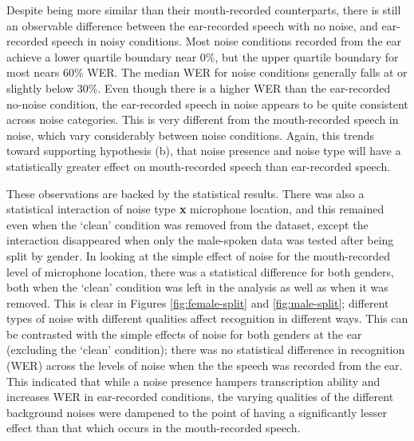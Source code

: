 Despite being more similar than their mouth-recorded counterparts, there is still an observable difference between the ear-recorded speech with no noise, and ear-recorded speech in noisy conditions.  Most noise conditions recorded from the ear achieve a lower quartile boundary near 0\%, but the upper quartile boundary for most nears 60\% WER.  The median WER for noise conditions generally falls at or slightly below 30\%. 
Even though there is a higher WER than the ear-recorded no-noise condition, the ear-recorded speech in noise appears to be quite consistent across noise categories.  This is very different from the mouth-recorded speech in noise, which vary considerably between noise conditions. Again, this trends toward supporting hypothesis (b), that noise presence and noise type will have a statistically greater effect on mouth-recorded speech than ear-recorded speech.

These observations are backed by the statistical results.  There was also a statistical interaction of noise type \textbf{x} microphone location, and this remained even when the `clean' condition was removed from the dataset, except the interaction disappeared when only the male-spoken data was tested after being split by gender.  In looking at the simple effect of noise for the mouth-recorded level of microphone location, there was a statistical difference for both genders, both when the `clean' condition was left in the analysis as well as when it was removed.  This is clear in Figures \ref{fig:female-split} and \ref{fig:male-split}; different types of noise with different qualities affect recognition in different ways.  This can be contrasted with the simple effects of noise for both genders at the ear (excluding the `clean' condition); there was no statistical difference in recognition (WER) across the levels of noise when the the speech was recorded from the ear.  This indicated that while a noise presence hampers transcription ability and increases WER in ear-recorded conditions, the varying qualities of the different background noises were dampened to the point of having a significantly lesser effect than that which occurs in the mouth-recorded speech.

